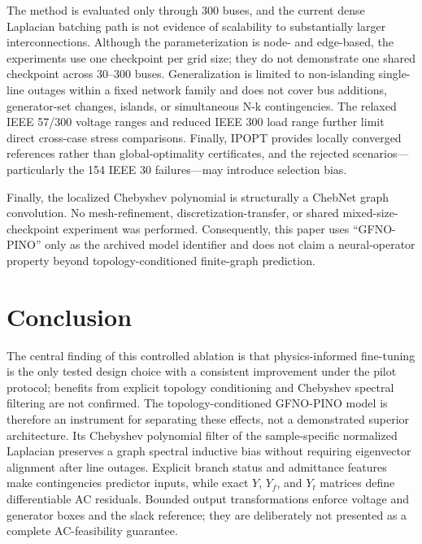 \documentclass[final,5p,times,twocolumn]{elsarticle}
\begin{document}
The method is evaluated only through 300 buses, and the current dense Laplacian
batching path is not evidence of scalability to substantially larger
interconnections. Although the parameterization is node- and edge-based, the
experiments use one checkpoint per grid size; they do not demonstrate one
shared checkpoint across 30--300 buses. Generalization is limited to
non-islanding single-line outages within a fixed network family and does
not cover bus additions, generator-set changes, islands, or simultaneous N-k
contingencies. The relaxed IEEE 57/300 voltage ranges and reduced IEEE 300 load
range further limit direct cross-case stress comparisons. Finally, IPOPT
provides locally converged references rather than global-optimality
certificates, and the rejected scenarios---particularly the 154 IEEE 30
failures---may introduce selection bias.

Finally, the localized Chebyshev polynomial is structurally a ChebNet graph
convolution. No mesh-refinement, discretization-transfer, or shared
mixed-size-checkpoint experiment was performed. Consequently, this paper uses
``GFNO-PINO'' only as the archived model identifier and does not claim a
neural-operator property beyond topology-conditioned finite-graph prediction.

\section{Conclusion}
\label{sec:conclusion}

The central finding of this controlled ablation is that physics-informed
fine-tuning is the only tested design choice with a consistent improvement
under the pilot protocol; benefits from explicit topology conditioning and
Chebyshev spectral filtering are not confirmed. The topology-conditioned
GFNO-PINO model is therefore an instrument for separating these effects, not a
demonstrated superior architecture. Its Chebyshev polynomial filter of the
sample-specific normalized Laplacian preserves a graph
spectral inductive bias without requiring eigenvector alignment after line
outages. Explicit branch status and admittance features make contingencies
predictor inputs, while exact $Y$, $Y_f$, and $Y_t$ matrices define
differentiable AC residuals. Bounded output transformations enforce voltage
and generator boxes and the slack reference; they are deliberately not
presented as a complete AC-feasibility guarantee.
\end{document}
